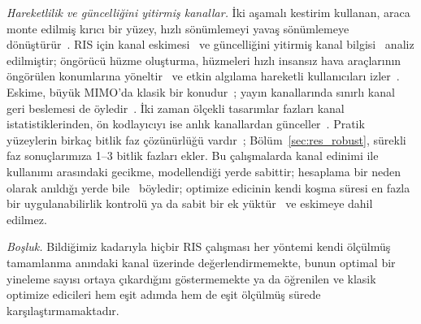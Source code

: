 \emph{Hareketlilik ve güncelliğini yitirmiş kanallar.} İki aşamalı kestirim kullanan, araca monte edilmiş kırıcı bir yüzey, hızlı sönümlemeyi yavaş sönümlemeye dönüştürür~\cite{Huang2022TWC}. RIS için kanal eskimesi~\cite{Papazafeiropoulos2023TVT} ve güncelliğini yitirmiş kanal bilgisi~\cite{Zhang2022TCOM} analiz edilmiştir; öngörücü hüzme oluşturma, hüzmeleri hızlı insansız hava araçlarının öngörülen konumlarına yöneltir~\cite{Liu2021WCL} ve etkin algılama hareketli kullanıcıları izler~\cite{Han2025TWC}. Eskime, büyük MIMO'da klasik bir konudur~\cite{Truong2013JCN,Chopra2018TWC}; yayın kanallarında sınırlı kanal geri beslemesi de öyledir~\cite{Jindal2006IT}. İki zaman ölçekli tasarımlar fazları kanal istatistiklerinden, ön kodlayıcıyı ise anlık kanallardan günceller~\cite{Zhao2021TWC,Cao2022TWC}. Pratik yüzeylerin birkaç bitlik faz çözünürlüğü vardır~\cite{Wu2020TCOM,Zhao2024OJCOMS}; Bölüm~\ref{sec:res_robust}, sürekli faz sonuçlarımıza 1--3 bitlik fazları ekler. Bu çalışmalarda kanal edinimi ile kullanımı arasındaki gecikme, modellendiği yerde sabittir; hesaplama bir neden olarak anıldığı yerde bile~\cite{Truong2013JCN} böyledir; optimize edicinin kendi koşma süresi en fazla bir uygulanabilirlik kontrolü ya da sabit bir ek yüktür~\cite{Ryu2026arXiv,Liu2021WCL} ve eskimeye dahil edilmez.

\emph{Boşluk.} Bildiğimiz kadarıyla hiçbir RIS çalışması her yöntemi kendi ölçülmüş tamamlanma anındaki kanal üzerinde değerlendirmemekte, bunun optimal bir yineleme sayısı ortaya çıkardığını göstermemekte ya da öğrenilen ve klasik optimize edicileri hem eşit adımda hem de eşit ölçülmüş sürede karşılaştırmamaktadır.
